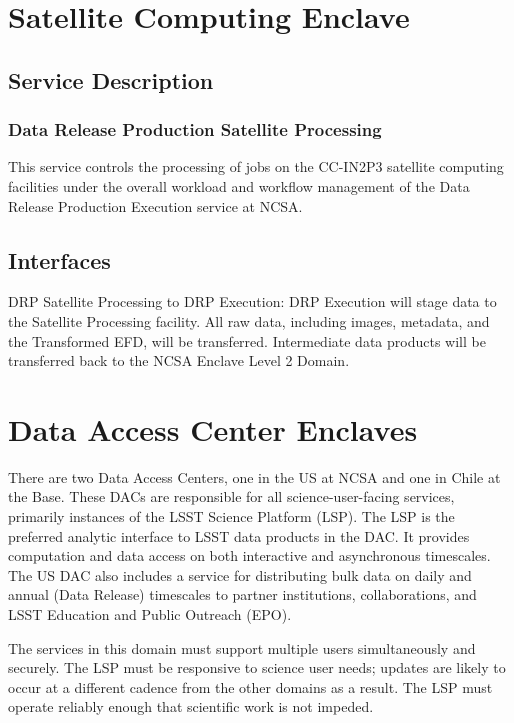 \documentclass[DM,lsstdraft,toc]{lsstdoc}
\begin{document}
\section{Satellite Computing Enclave}\label{satellite-computing-enclave}

\subsection{Service Description}\label{satellite-service-description}

\subsubsection{Data Release Production Satellite
Processing}\label{data-release-production-satellite-processing}

This service controls the processing of jobs on the CC-IN2P3 satellite
computing facilities under the overall workload and workflow management
of the Data Release Production Execution service at NCSA.

\subsection{Interfaces}\label{satellite-interfaces}
DRP Satellite Processing to DRP Execution: DRP Execution will stage data
to the Satellite Processing facility.  All raw data, including images,
metadata, and the Transformed EFD, will be transferred.  Intermediate
data products will be transferred back to the NCSA Enclave Level 2 Domain.


\section{Data Access Center Enclaves}\label{data-access-center-enclaves}

There are two Data Access Centers, one in the US at NCSA and one in
Chile at the Base. These DACs are responsible for all
science-user-facing services, primarily instances of the LSST Science
Platform (LSP). The LSP is the preferred analytic interface to LSST data
products in the DAC. It provides computation and data access on both
interactive and asynchronous timescales. The US DAC also includes a
service for distributing bulk data on daily and annual (Data Release)
timescales to partner institutions, collaborations, and LSST Education
and Public Outreach (EPO).

The services in this domain must support multiple users simultaneously
and securely. The LSP must be responsive to science user needs; updates
are likely to occur at a different cadence from the other domains as a
result. The LSP must operate reliably enough that scientific work is not
impeded.
\end{document}
